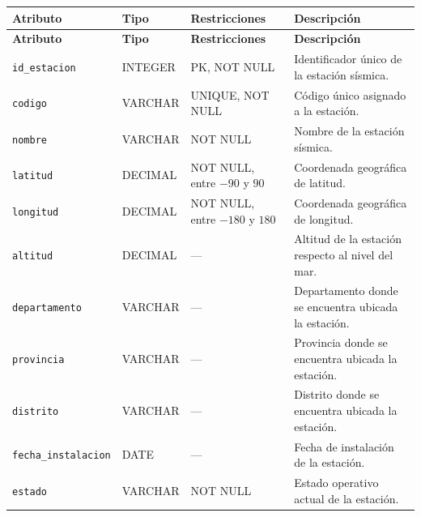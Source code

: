 \documentclass[12pt,a4paper]{article}
\begin{document}
{
\small
\setlength{\tabcolsep}{3pt}
\renewcommand{\arraystretch}{1.15}

\begin{longtable}{
    >{\raggedright\arraybackslash}p{4.25cm}
    >{\raggedright\arraybackslash}p{2.65cm}
    >{\raggedright\arraybackslash}p{3.85cm}
    >{\raggedright\arraybackslash}p{3.85cm}
}
\toprule
\textbf{Atributo} &
\textbf{Tipo} &
\textbf{Restricciones} &
\textbf{Descripción} \\
\midrule
\endfirsthead

\toprule
\textbf{Atributo} &
\textbf{Tipo} &
\textbf{Restricciones} &
\textbf{Descripción} \\
\midrule
\endhead

\texttt{id\_\allowbreak{}estacion} &
INTEGER &
PK, NOT NULL &
Identificador único de la estación sísmica. \\

\texttt{codigo} &
VARCHAR &
UNIQUE, NOT NULL &
Código único asignado a la estación. \\

\texttt{nombre} &
VARCHAR &
NOT NULL &
Nombre de la estación sísmica. \\

\texttt{latitud} &
DECIMAL &
NOT NULL, entre $-90$ y $90$ &
Coordenada geográfica de latitud. \\

\texttt{longitud} &
DECIMAL &
NOT NULL, entre $-180$ y $180$ &
Coordenada geográfica de longitud. \\

\texttt{altitud} &
DECIMAL &
--- &
Altitud de la estación respecto al nivel del mar. \\

\texttt{departamento} &
VARCHAR &
--- &
Departamento donde se encuentra ubicada la estación. \\

\texttt{provincia} &
VARCHAR &
--- &
Provincia donde se encuentra ubicada la estación. \\

\texttt{distrito} &
VARCHAR &
--- &
Distrito donde se encuentra ubicada la estación. \\

\texttt{fecha\_\allowbreak{}instalacion} &
DATE &
--- &
Fecha de instalación de la estación. \\

\texttt{estado} &
VARCHAR &
NOT NULL &
Estado operativo actual de la estación. \\

\bottomrule
\end{longtable}
}
\end{document}
